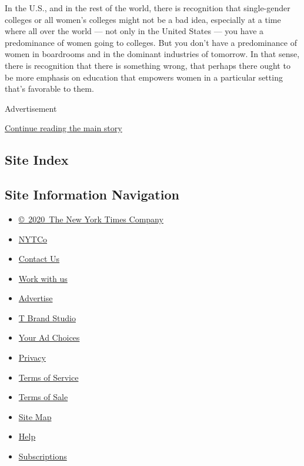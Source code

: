In the U.S., and in the rest of the world, there is recognition that
single-gender colleges or all women's colleges might not be a bad idea,
especially at a time where all over the world --- not only in the United
States --- you have a predominance of women going to colleges. But you
don't have a predominance of women in boardrooms and in the dominant
industries of tomorrow. In that sense, there is recognition that there
is something wrong, that perhaps there ought to be more emphasis on
education that empowers women in a particular setting that's favorable
to them.

Advertisement

\protect\hyperlink{after-bottom}{Continue reading the main story}

\hypertarget{site-index}{%
\subsection{Site Index}\label{site-index}}

\hypertarget{site-information-navigation}{%
\subsection{Site Information
Navigation}\label{site-information-navigation}}

\begin{itemize}
\tightlist
\item
  \href{https://help.nytimes.com/hc/en-us/articles/115014792127-Copyright-notice}{©~2020~The
  New York Times Company}
\end{itemize}

\begin{itemize}
\tightlist
\item
  \href{https://www.nytco.com/}{NYTCo}
\item
  \href{https://help.nytimes.com/hc/en-us/articles/115015385887-Contact-Us}{Contact
  Us}
\item
  \href{https://www.nytco.com/careers/}{Work with us}
\item
  \href{https://nytmediakit.com/}{Advertise}
\item
  \href{http://www.tbrandstudio.com/}{T Brand Studio}
\item
  \href{https://www.nytimes.com/privacy/cookie-policy\#how-do-i-manage-trackers}{Your
  Ad Choices}
\item
  \href{https://www.nytimes.com/privacy}{Privacy}
\item
  \href{https://help.nytimes.com/hc/en-us/articles/115014893428-Terms-of-service}{Terms
  of Service}
\item
  \href{https://help.nytimes.com/hc/en-us/articles/115014893968-Terms-of-sale}{Terms
  of Sale}
\item
  \href{https://spiderbites.nytimes.com}{Site Map}
\item
  \href{https://help.nytimes.com/hc/en-us}{Help}
\item
  \href{https://www.nytimes.com/subscription?campaignId=37WXW}{Subscriptions}
\end{itemize}
